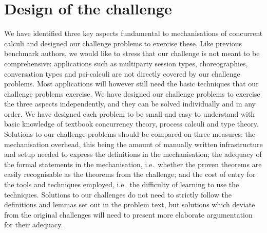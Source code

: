 \documentclass[submission,copyright,creativecommons]{eptcs}
\begin{document}
\section{Design of the challenge}
We have identified three key aspects fundamental to mechanisations of concurrent calculi and designed our challenge problems to exercise these.
Like previous benchmark authors, we would like to stress that our challenge is not meant to be comprehensive: applications such as multiparty session types, choreographies, conversation types and psi-calculi are not directly covered by our challenge problems.
Most applications will however still need the basic techniques that our challenge problems exercise.
We have designed our challenge problems to exercise the three aspects independently, and they can be solved individually and in any order.
We have designed each problem to be small and easy to understand with basic knowledge of textbook concurrency theory, process calculi and type theory.
Solutions to our challenge problems should be compared on three measures: the mechanisation overhead, this being the amount of manually written infrastructure and setup needed to express the definitions in the mechanisation; the adequacy of the formal statements in the mechanisation, i.e.\ whether the proven theorems are easily recognisable as the theorems from the challenge; and the cost of entry for the tools and techniques employed, i.e.\ the difficulty of learning to use the techniques.
Solutions to our challenges do not need to strictly follow the definitions and lemmas set out in the problem text, but solutions which deviate from the original challenges will need to present more elaborate argumentation for their adequacy.
\end{document}
